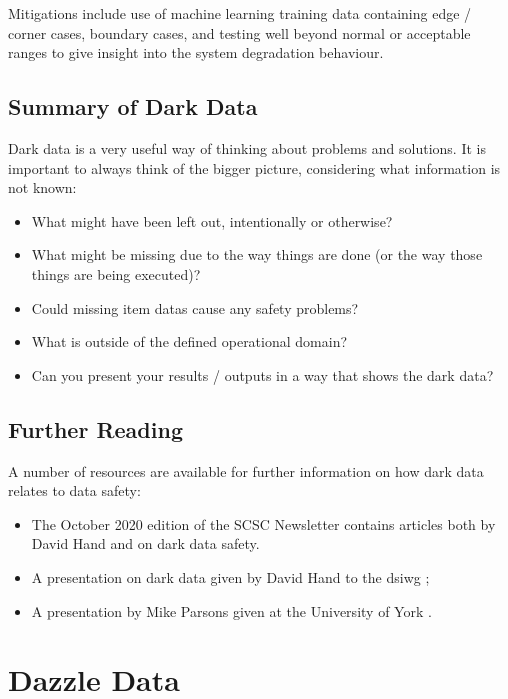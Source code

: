 Mitigations include use of machine learning training data containing edge / corner cases, boundary cases, and testing well beyond normal or acceptable ranges to give insight into the system degradation behaviour.
\subsection{Summary of Dark Data}
Dark data is a very useful way of thinking about problems and solutions. It is important to always think of the bigger picture, considering what \gls{information} is not known:

\begin{itemize}
  \item What might have been left out, intentionally or otherwise?
  \item What might be missing due to the way things are done (or the way those things are being executed)?
  \item Could missing \glspl{item data} cause any safety problems?
  \item What is outside of the defined operational domain?
  \item Can you present your results / outputs in a way that shows the dark data?
\end{itemize}

\subsection{Further Reading}
A number of resources are available for further \gls{information} on how dark data relates to data safety:
\begin{itemize}
\item The October 2020 edition of the SCSC Newsletter \cite{citation:SCSC160} contains articles both by David Hand and on dark data safety.
  \item A presentation on dark data given by David Hand to the \gls{dsiwg} \cite{citation:darkdata:presentation1};
  \item A presentation by Mike Parsons given at the University of York \cite{citation:darkdata:presentation2}.
\end{itemize}
%
%
%
%
\section{Dazzle Data}\label{bkm:dazzledata}
%

